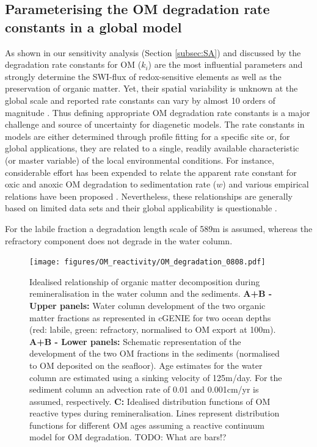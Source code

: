 \documentclass[gmd, manuscript]{copernicus}
\begin{document}
\subsection{Parameterising the OM degradation rate constants in a global model}\label{subsec:Parameterising_OM_rate_const}
As shown in our sensitivity analysis (Section \ref{subsec:SA}) and discussed by \citet{arndt_quantifying_2013} the 
degradation rate constants for OM ($k_i$) are the most influential parameters and strongly determine the SWI-flux of redox-sensitive elements as well as the preservation of organic matter. 
Yet, their spatial variability is unknown at the global scale and reported rate constants can vary by almost 10 orders of magnitude \citep{arndt_quantifying_2013}. 
Thus defining appropriate OM degradation rate constants is a major challenge and source of uncertainty for diagenetic models. The rate constants in models are either determined through profile fitting for a specific site or, 
for global applications, they are related to a single, readily available characteristic (or master variable) of the local environmental conditions. 
For instance, considerable effort has been expended to relate the apparent rate constant for oxic and 
anoxic OM degradation to sedimentation rate ($w$) and various empirical relations have been proposed \citep{toth_organic_1977, tromp_global_1995, boudreau1997diagenetic, stolpovsky_toward_2015}. 
Nevertheless, these relationships are generally based on limited data sets and their global applicability is questionable \citep{arndt_quantifying_2013}. 


For the labile fraction a degradation length scale of 589m is assumed, whereas the refractory component does not degrade in the water column. 
\begin{figure}[htbp]
\begin{center}
	\texttt{[image: figures/OM\_reactivity/OM\_degradation\_0808.pdf]}
	\caption{Idealised relationship of organic matter decomposition during remineralisation in the water column and the sediments. 
	\textbf{A+B - Upper panels:} Water column development of the two organic matter fractions as represented in cGENIE for two ocean depths 
	(red: labile, green: refractory, normalised to OM export at 100m). 
	\textbf{A+B - Lower panels:} Schematic representation of the development of the two OM fractions in the sediments (normalised to OM deposited on the seafloor). 
	Age estimates for the water column are estimated using a sinking velocity of 125m/day. For the sediment column an advection rate of 0.01 and 0.001cm/yr is assumed, 
	respectively. \textbf{C:} Idealised distribution functions of OM reactive types during remineralisation. Lines represent distribution functions for different OM ages   
	assuming a reactive continuum model for OM degradation. TODO: What are bars!?
	}\label{fig:OM_reactivity}
\end{center}
\end{figure}
\end{document}
